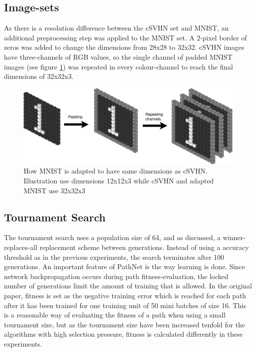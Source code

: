 \subsection{Image-sets}
As there is a resolution difference between the cSVHN set and MNIST, an additional preprocessing step was applied to the MNIST set. A 2-pixel border of zeros was added to change the dimensions from 28x28 to 32x32. cSVHN images have three-channels of RGB values, so the single channel of padded MNIST images (see figure \ref{fig:MNISTpadding}) was repeated in every colour-channel to reach the final dimensions of 32x32x3.  

\begin{figure}[ht]
    \includegraphics[width=\textwidth]{Chapters/4.Experiments/exp2/figures/MNISTpadding+repeating.png}
    \caption[MNIST modifications]{How MNIST is adapted to have same dimensions as cSVHN. Illustration use dimensions 12x12x3 while cSVHN and adapted MNIST use 32x32x3}
    \label{fig:MNISTpadding}
\end{figure}

\subsection{Tournament Search}\label{exp2:implementation.search}
The tournament search uses a population size of 64, and as discussed, a winner-replaces-all replacement scheme between generations. Instead of using a accuracy threshold as in the previous experiments, the search terminates after 100 generations. An important feature of PathNet is the way learning is done. Since network backpropagation occurs during path fitness-evaluation, the locked number of generations limit the amount of training that is allowed. In the original paper, fitness is set as the negative training error which is reached for each path after it has been trained for one training unit of 50 mini batches of size 16. This is a reasonable way of evaluating the fitness of a path when using a small tournament size, but as the tournament size have been increased tenfold for the algorithms with high selection pressure, fitness is calculated differently in these experiments. 

